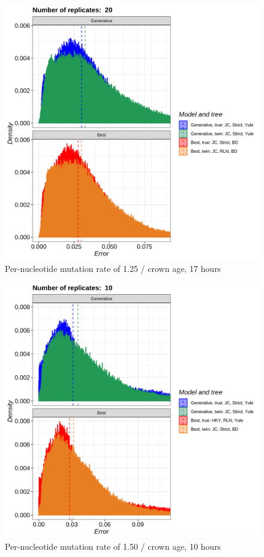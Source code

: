 \begin{figure}[H]
  \includegraphics[width=\textwidth]{pirouette_example_38/errors.png}
  \caption{Per-nucleotide mutation rate of 1.25 / crown age, 17 hours}
\end{figure}

\begin{figure}[H]
  \includegraphics[width=\textwidth]{pirouette_example_39/errors.png}
  \caption{Per-nucleotide mutation rate of 1.50 / crown age, 10 hours}
\end{figure}

